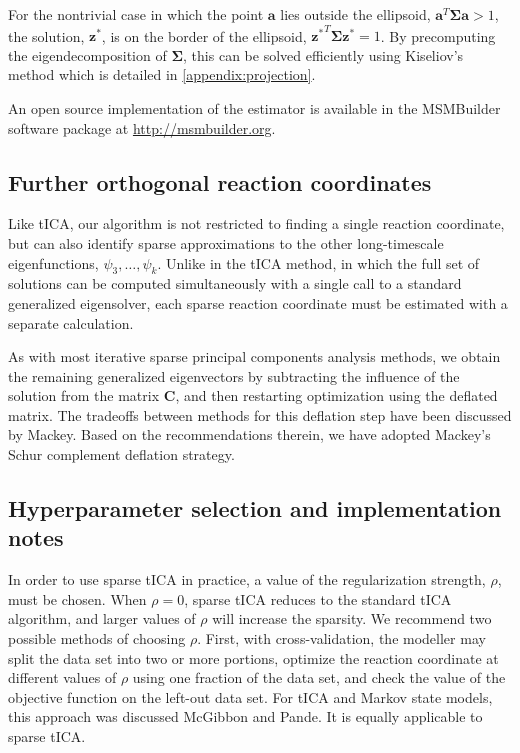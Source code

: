 \documentclass[aip, jcp, reprint, nolinenumbers, twocolumn, nobalancelastpage, nofootinbib]{revtex4-1}
\begin{document}
For the nontrivial case in which the point $\mathbf{a}$ lies outside the ellipsoid, $\mathbf{a}^T\mathbf{\Sigma}\mathbf{a} > 1$, the solution, $\mathbf{z}^*$, is on the border of the ellipsoid, ${\mathbf{z}^*}^T \mathbf{\Sigma} \mathbf{z}^* = 1$. By precomputing the eigendecomposition of $\mathbf{\Sigma}$, this can be solved efficiently using Kiseliov's method which is detailed in \cref{appendix:projection}.\cite{kiseliov1994algorithms}

An open source implementation of the estimator is available in the MSMBuilder software package at \url{http://msmbuilder.org}.

\subsection{Further orthogonal reaction coordinates}

Like tICA, our algorithm is not restricted to finding a single reaction coordinate, but can also identify sparse approximations to the other long-timescale eigenfunctions, $\psi_3, \ldots, \psi_k$. Unlike in the tICA method, in which the full set of solutions can be computed simultaneously with a single call to a standard generalized eigensolver, each sparse reaction coordinate must be estimated with a separate calculation.

As with most iterative sparse principal components analysis methods, we obtain the remaining generalized eigenvectors by subtracting the influence of the solution from the matrix $\mathbf{C}$, and then restarting optimization using the deflated matrix. The tradeoffs between methods for this deflation step have been discussed by Mackey.\cite{mackey2009deflation} Based on the recommendations therein, we have adopted Mackey's Schur complement deflation strategy.

\subsection{Hyperparameter selection and implementation notes}

In order to use sparse tICA in practice, a value of the regularization strength, $\rho$, must be chosen. When $\rho=0$, sparse tICA reduces to the standard tICA algorithm, and larger values of $\rho$ will increase the sparsity. We recommend two possible methods of choosing $\rho$. First, with cross-validation, the modeller may split the data set into two or more portions, optimize the reaction coordinate at different values of $\rho$ using one fraction of the data set, and check the value of the objective function on the left-out data set. For tICA and Markov state models, this approach was discussed McGibbon and Pande.\cite{mcgibbon2015variational} It is equally applicable to sparse tICA.
\end{document}
